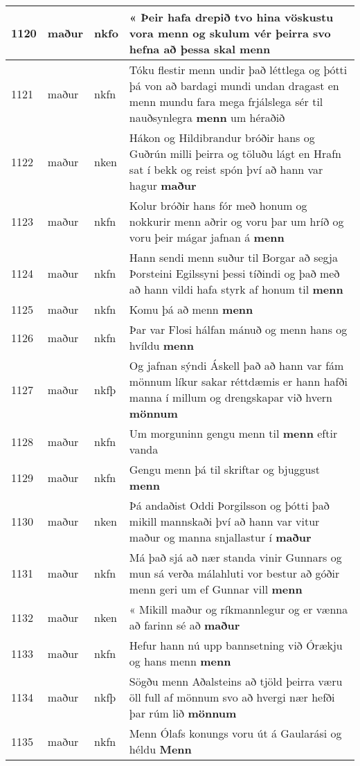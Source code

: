 \documentclass{article}
\begin{document}
\begin{longtable}{p{1cm}|p{1cm}|p{1cm}|p{13cm}}
\hline
1120&maður&nkfo&« Þeir hafa drepið tvo hina vöskustu vora menn og skulum vér þeirra svo hefna að þessa skal \textbf{menn} \\
\hline
1121&maður&nkfn&Tóku flestir menn undir það léttlega og þótti þá von að bardagi mundi undan dragast en menn mundu fara mega frjálslega sér til nauðsynlegra \textbf{menn} um héraðið\\
\hline
1122&maður&nken&Hákon og Hildibrandur bróðir hans og Guðrún milli þeirra og töluðu lágt en Hrafn sat í bekk og reist spón því að hann var hagur \textbf{maður} \\
\hline
1123&maður&nkfn&Kolur bróðir hans fór með honum og nokkurir menn aðrir og voru þar um hríð og voru þeir mágar jafnan á \textbf{menn} \\
\hline
1124&maður&nkfn&Hann sendi menn suður til Borgar að segja Þorsteini Egilssyni þessi tíðindi og það með að hann vildi hafa styrk af honum til \textbf{menn} \\
\hline
1125&maður&nkfn&Komu þá að menn \textbf{menn} \\
\hline
1126&maður&nkfn&Þar var Flosi hálfan mánuð og menn hans og hvíldu \textbf{menn} \\
\hline
1127&maður&nkfþ&Og jafnan sýndi Áskell það að hann var fám mönnum líkur sakar réttdæmis er hann hafði manna í millum og drengskapar við hvern \textbf{mönnum} \\
\hline
1128&maður&nkfn&Um morguninn gengu menn til \textbf{menn} eftir vanda\\
\hline
1129&maður&nkfn&Gengu menn þá til skriftar og bjuggust \textbf{menn} \\
\hline
1130&maður&nken&Þá andaðist Oddi Þorgilsson og þótti það mikill mannskaði því að hann var vitur maður og manna snjallastur í \textbf{maður} \\
\hline
1131&maður&nkfn&Má það sjá að nær standa vinir Gunnars og mun sá verða málahluti vor bestur að góðir menn geri um ef Gunnar vill \textbf{menn} \\
\hline
1132&maður&nken&« Mikill maður og ríkmannlegur og er vænna að farinn sé að \textbf{maður} \\
\hline
1133&maður&nkfn&Hefur hann nú upp bannsetning við Órækju og hans menn \textbf{menn} \\
\hline
1134&maður&nkfþ&Sögðu menn Aðalsteins að tjöld þeirra væru öll full af mönnum svo að hvergi nær hefði þar rúm lið \textbf{mönnum} \\
\hline
1135&maður&nkfn&Menn Ólafs konungs voru út á Gaularási og héldu \textbf{Menn} \\

\end{longtable}
\end{document}
